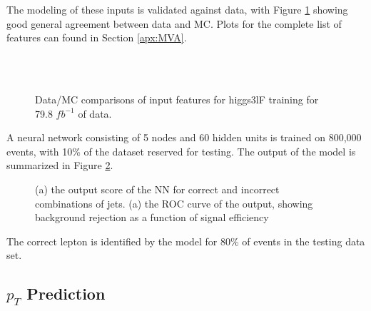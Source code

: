 The modeling of these inputs is validated against data, with Figure \ref{fig:model_higgs3lF} showing good general agreement between data and MC. Plots for the complete list of features can found in Section \ref{apx:MVA}.

\begin{figure}[H]
    \centering
    \\
    \\
    \caption{Data/MC comparisons of input features for higgs3lF training for 79.8 $fb^{-1}$ of data.}
    \label{fig:model_higgs3lF}
\end{figure} 

A neural network consisting of 5 nodes and 60 hidden units is trained on 800,000 events, with 10\% of the dataset reserved for testing. The output of the model is summarized in Figure \ref{fig:higgs3lFresults}.

\begin{figure}[H]
  \centering
  \label{fig:higgs3lFresults}
  \caption{(a) the output score of the NN for correct and incorrect combinations of jets. (a) the ROC curve of the output, showing background rejection as a function of signal efficiency}
\end{figure} 

The correct lepton is identified by the model for 80\% of events in the testing data set.


\subsection{$p_T$ Prediction}
\label{sec:ptReco}

